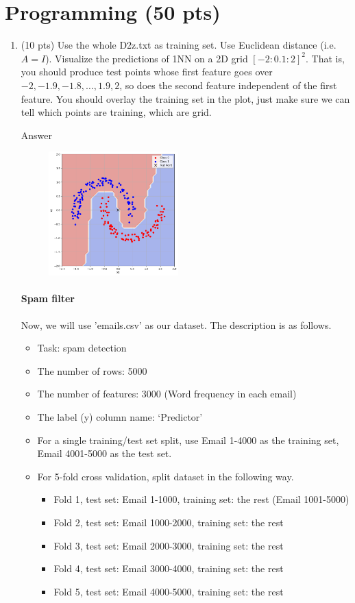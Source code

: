 \documentclass[a4paper]{article}
\theoremstyle{definition}
\begin{document}
\section{Programming (50 pts)}
\begin{enumerate}
	\item (10 pts) Use the whole D2z.txt as training set.  Use Euclidean distance (i.e. $A=I$).
	Visualize the predictions of 1NN on a 2D grid $[-2:0.1:2]^2$.
	That is, you should produce test points whose first feature goes over $-2, -1.9, -1.8, \ldots, 1.9, 2$, so does the second feature independent of the first feature.
	You should overlay the training set in the plot, just make sure we can tell which points are training, which are grid.
	
	Answer
	\begin{figure}[h]
		\centering
		\includegraphics[width=5cm]{D2z.png}
	\end{figure}
	
	\paragraph{Spam filter} Now, we will use 'emails.csv' as our dataset. The description is as follows.
	
	\begin{itemize}
		\item Task: spam detection
		\item The number of rows: 5000
		\item The number of features: 3000 (Word frequency in each email)
		\item The label (y) column name: `Predictor'
		\item For a single training/test set split, use Email 1-4000 as the training set, Email 4001-5000 as the test set.
		\item For 5-fold cross validation, split dataset in the following way.
		\begin{itemize}
			\item Fold 1, test set: Email 1-1000, training set: the rest (Email 1001-5000)
			\item Fold 2, test set: Email 1000-2000, training set: the rest
			\item Fold 3, test set: Email 2000-3000, training set: the rest
			\item Fold 4, test set: Email 3000-4000, training set: the rest
			\item Fold 5, test set: Email 4000-5000, training set: the rest			
		\end{itemize}
	\end{itemize}
	

\end{enumerate}
\end{document}
